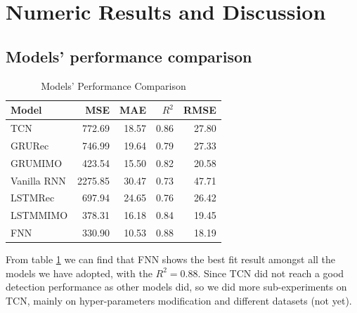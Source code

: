 \section{Numeric Results and Discussion}

\subsection{Models' performance comparison}
\begin{table}[H]
\centering
\caption{Models' Performance Comparison}
\begin{tabular}{l r r r r}
\toprule
\textbf{Model} & \textbf{MSE} & \textbf{MAE} & \textbf{$R^2$}& \textbf{RMSE}\\
\midrule
TCN & 772.69& 18.57& 0.86& 27.80\\
GRU\-Rec & 746.99& 19.64& 0.79& 27.33 \\
GRU\-MIMO& 423.54& 15.50& 0.82& 20.58 \\
Vanilla RNN& 2275.85& 30.47& 0.73& 47.71 \\
LSTM\-Rec & 697.94& 24.65& 0.76& 26.42 \\
LSTM\-MIMO & 378.31& 16.18& 0.84& 19.45 \\
FNN & 330.90& 10.53& \color{red}0.88& 18.19 \\
\bottomrule
\end{tabular}
\label{tab:models}
\end{table}

From table \ref{tab:models} we can find that FNN shows the best fit result amongst all the models we have adopted, with the $R^2 = 0.88$. Since TCN did not reach a good detection performance as other models did, so we did more sub-experiments on TCN, mainly on hyper-parameters modification and different datasets (not yet).


